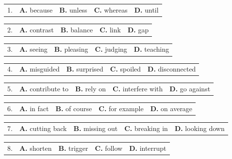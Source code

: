 \documentclass[UTF8,11pt]{ctexart}
\begin{document}
\noindent\begin{tabularx}{\linewidth}{@{}lXXXX@{}}1. & \textbf{A.} because & \textbf{B.} unless & \textbf{C.} whereas & \textbf{D.} until\\\end{tabularx}\par

\noindent\begin{tabularx}{\linewidth}{@{}lXXXX@{}}2. & \textbf{A.} contrast & \textbf{B.} balance & \textbf{C.} link & \textbf{D.} gap\\\end{tabularx}\par

\noindent\begin{tabularx}{\linewidth}{@{}lXXXX@{}}3. & \textbf{A.} seeing & \textbf{B.} pleasing & \textbf{C.} judging & \textbf{D.} teaching\\\end{tabularx}\par

\noindent\begin{tabularx}{\linewidth}{@{}lXXXX@{}}4. & \textbf{A.} misguided & \textbf{B.} surprised & \textbf{C.} spoiled & \textbf{D.} disconnected\\\end{tabularx}\par

\noindent\begin{tabularx}{\linewidth}{@{}lXXXX@{}}5. & \textbf{A.} contribute to & \textbf{B.} rely on & \textbf{C.} interfere with & \textbf{D.} go against\\\end{tabularx}\par

\noindent\begin{tabularx}{\linewidth}{@{}lXXXX@{}}6. & \textbf{A.} in fact & \textbf{B.} of course & \textbf{C.} for example & \textbf{D.} on average\\\end{tabularx}\par

\noindent\begin{tabularx}{\linewidth}{@{}lXXXX@{}}7. & \textbf{A.} cutting back & \textbf{B.} missing out & \textbf{C.} breaking in & \textbf{D.} looking down\\\end{tabularx}\par

\noindent\begin{tabularx}{\linewidth}{@{}lXXXX@{}}8. & \textbf{A.} shorten & \textbf{B.} trigger & \textbf{C.} follow & \textbf{D.} interrupt\\\end{tabularx}\par
\end{document}

